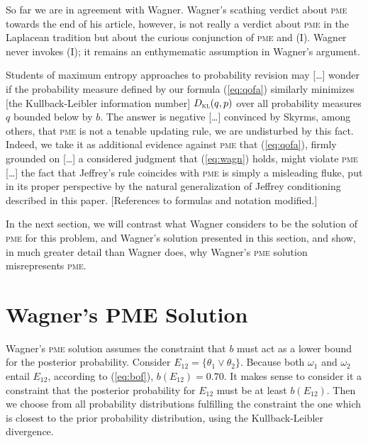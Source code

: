 \documentclass[phd,12pt,oneside]{ubcthesis}
\begin{document}
So far we are in agreement with Wagner. Wagner's scathing verdict
about \textsc{pme} towards the end of his article, however, is not
really a verdict about \textsc{pme} in the Laplacean tradition but
about the curious conjunction of \textsc{pme} and (I). Wagner never
invokes (I); it remains an enthymematic assumption in Wagner's
argument.

\begin{quotex}
  Students of maximum entropy approaches to probability revision may
  [\ldots] wonder if the probability measure defined by our formula
  (\ref{eq:qofa}) similarly minimizes [the Kullback-Leibler
  information number] $D_{\textsc{kl}}(q,p)$ over all probability
  measures $q$ bounded below by $b$. The answer is negative [\ldots]
  convinced by Skyrms, among others, that \textsc{pme} is not a
  tenable updating rule, we are undisturbed by this fact. Indeed, we
  take it as additional evidence against \textsc{pme} that
  (\ref{eq:qofa}), firmly grounded on [\ldots] a considered judgment
  that (\ref{eq:wagn}) holds, might violate \textsc{pme} [\ldots]
  the fact that Jeffrey's rule coincides with \textsc{pme} is
  simply a misleading fluke, put in its proper perspective by the
  natural generalization of Jeffrey conditioning described in
  this paper. [References to formulas and notation modified.]
\end{quotex}

In the next section, we will contrast what Wagner considers to be the
solution of \textsc{pme} for this problem,  and
Wagner's solution presented in this section,  and show, in much greater detail than Wagner does, why
Wagner's \textsc{pme} solution misrepresents \textsc{pme}.

\section{Wagner's PME Solution}
\label{sec:gaephuiw}

Wagner's \textsc{pme} solution assumes the constraint that $b$ must act as a
lower bound for the posterior probability. Consider
$E_{12}=\{\theta_{1}\vee\theta_{2}\}$. Because both $\omega_{1}$ and
$\omega_{2}$ entail $E_{12}$, according to (\ref{eq:bof}),
$b(E_{12})=0.70$. It makes sense to consider it a constraint that the
posterior probability for $E_{12}$ must be at least $b(E_{12})$. Then
we choose from all probability distributions fulfilling the constraint
the one which is closest to the prior probability distribution, using
the Kullback-Leibler divergence.
\end{document}
